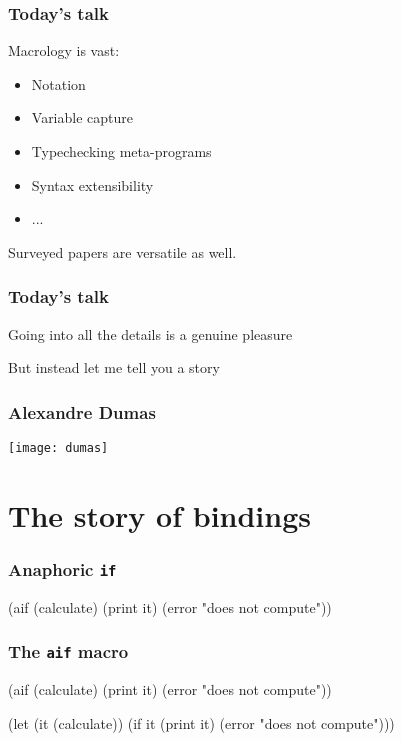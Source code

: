 \documentclass[hyperref={bookmarks=false}]{beamer}
\begin{document}
\begin{frame}[fragile]
\frametitle{Today's talk}

Macrology is vast:
\begin{itemize}
\item Notation
\item Variable capture
\item Typechecking meta-programs
\item Syntax extensibility
\item ...
\end{itemize}

\pause
Surveyed papers are versatile as well.
\end{frame}

\begin{frame}[fragile]
\frametitle{Today's talk}

Going into all the details is a genuine pleasure

But instead let me tell you a story
\end{frame}

\begin{frame}[fragile]
\frametitle{Alexandre Dumas}

\begin{center}
\texttt{[image: dumas]}
\end{center}
\end{frame}

\section{The story of bindings}

\begin{frame}[fragile]
\frametitle{Anaphoric \texttt{if}}
\begin{semiverbatim}
(aif (calculate)
  (print it)
  (error "does not compute"))
\end{semiverbatim}
\end{frame}

\begin{frame}[fragile]
\frametitle{The \texttt{aif} macro}
\begin{semiverbatim}
(aif (calculate)
  (print it)
  (error "does not compute"))


(let (it (calculate))
  (if it
    (print it)
    (error "does not compute")))
\end{semiverbatim}
\end{frame}
\end{document}
